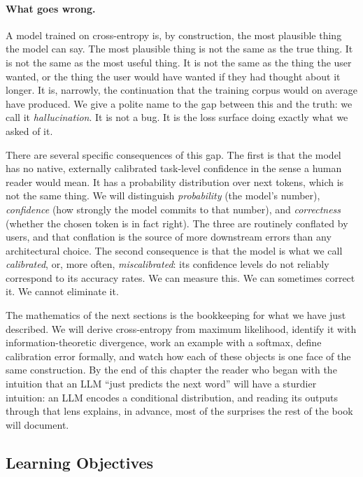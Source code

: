 \paragraph{What goes wrong.} A model trained on cross-entropy is,
by construction, the most plausible thing the model can say. The
most plausible thing is not the same as the true thing. It is not
the same as the most useful thing. It is not the same as the
thing the user wanted, or the thing the user would have wanted if
they had thought about it longer. It is, narrowly, the
continuation that the training corpus would on average have
produced. We give a polite name to the gap between this and the
truth: we call it \emph{hallucination}. It is not a bug. It is the
loss surface doing exactly what we asked of it.

There are several specific consequences of this gap. The first is
that the model has no native, externally calibrated task-level
confidence in the sense a human reader would mean. It has a
probability distribution over
next tokens, which is not the same thing. We will distinguish
\emph{probability} (the model's number), \emph{confidence} (how
strongly the model commits to that number), and
\emph{correctness} (whether the chosen token is in fact right).
The three are routinely conflated by users, and that conflation is
the source of more downstream errors than any architectural
choice. The second consequence is that the model is what we call
\emph{calibrated}, or, more often, \emph{miscalibrated}: its
confidence levels do not reliably correspond to its accuracy
rates. We can measure this. We can sometimes correct it. We
cannot eliminate it.

The mathematics of the next sections is the bookkeeping for what
we have just described. We will derive cross-entropy from
maximum likelihood, identify it with information-theoretic
divergence, work an example with a softmax, define
calibration error formally, and watch how each of these objects
is one face of the same construction. By the end of this chapter
the reader who began with the intuition that an LLM ``just
predicts the next word'' will have a sturdier intuition: an LLM
encodes a conditional distribution, and reading its outputs
through that lens explains, in advance, most of the surprises the
rest of the book will document.

\subsection{Learning Objectives}

